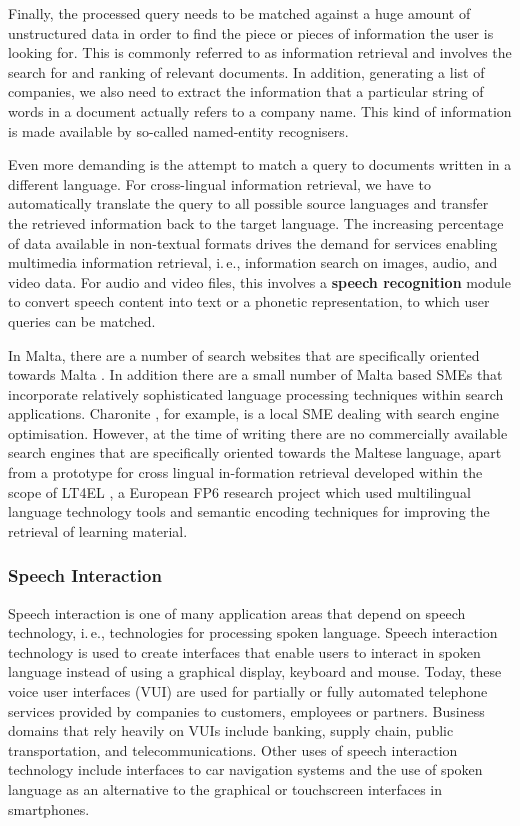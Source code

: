 \documentclass[]{../../metanetpaper}
\begin{document}
\begin{multicols}{2}
Finally, the processed query needs to be matched against a huge amount of unstructured data in order to find the piece or pieces of information the user is looking for. This is commonly referred to as information retrieval and involves the search for and ranking of relevant documents. In addition, generating a list of companies, we also need to extract the information that a particular string of words in a document actually refers to a company name. This kind of information is made available by so-called named-entity recognisers. 

Even more demanding is the attempt to match a query to documents written in a different language. For cross-lingual information retrieval, we have to automatically translate the query to all possible source languages and transfer the retrieved information back to the target language. The increasing percentage of data available in non-textual formats drives the demand for services enabling multimedia information retrieval, i.\,e., information search on images, audio, and video data. For audio and video files, this involves a \textbf{speech recognition} module to convert speech content into text or a phonetic representation, to which user queries can be matched.

In Malta, there are a number of search websites that are specifically oriented towards Malta \cite{philb1}. In addition there are a small number of Malta based SMEs that incorporate relatively sophisticated language processing techniques within search applications. Charonite \cite{charonite1}, for example, is a local SME dealing with search engine optimisation. However, at the time of writing there are no commercially available search engines that are specifically oriented towards the Maltese language, apart from a prototype for cross lingual in-formation retrieval developed within the scope of LT4EL \cite{let1}, a European FP6 research project which used multilingual language technology tools and semantic encoding techniques for improving the retrieval of learning material. 

\subsubsection{Speech Interaction}

Speech interaction is one of many application areas that depend on speech technology, i.\,e., technologies for processing spoken language. Speech interaction technology is used to create interfaces that enable users to interact in spoken language instead of using a graphical display, keyboard and mouse.  Today, these voice user interfaces (VUI) are used for partially or fully automated telephone services provided by companies to customers, employees or partners. Business domains that rely heavily on VUIs include banking, supply chain, public transportation, and telecommunications. Other uses of speech interaction technology include interfaces to car navigation systems and the use of spoken language as an alternative to the graphical or touchscreen interfaces in smartphones.


\end{multicols}
\end{document}
